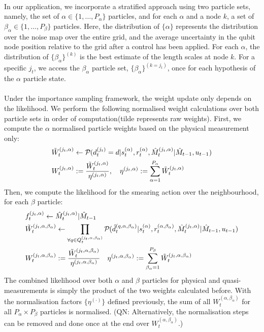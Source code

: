 \\
In our application, we incorporate a stratified approach using two particle sets, namely, the set of $\alpha \in \{1, \hdots ,P_\alpha\}$ particles, and for each $\alpha$ and a node $k$, a set of $\beta_\alpha \in \{1, \hdots ,P_\beta\}$ particles. Here, the distribution of $\{\alpha \}$  represents the distribution over the noise map over the entire grid, and the average uncertainty in the qubit node position relative to the grid after a control has been applied. For each $\alpha$, the distribution of $\{ \beta_\alpha \}^{(k)} $ is the best estimate of the length scales at node $k$. For a specific $j_t$, we access the $\beta_\alpha$ particle set, $\{ \beta_\alpha \}^{(k=j_t)} $, once for each hypothesis of the $\alpha$ particle state. \\
\\
Under the importance sampling framework, the weight update only depends on the likelihood. We perform the following normalised weight calculations over both particle sets in order of computation(tilde represents raw weights). First, we compute the $\alpha$ normalised particle weights based on the physical measurement only:
\begin{align}
\tilde{W}_t^{(j_t, \alpha)}& \leftarrow \mathcal{P}_{} ( d^{( j_t )}_{t}=d | s_{ t}^{(\alpha)}, r_{ t}^{(\alpha)}, \hat{M}_t^{(j_t, \alpha)}| \hat{M}_{t-1}, u_{t-1 } ) \\
W_t^{(j_t, \alpha)} &:= \frac{\tilde{W}_t^{(j_t, \alpha)}}{\eta^{(j_t, \alpha)}}, \quad \eta^{(j_t, \alpha)} := \sum_{\alpha = 1}^{P_{\alpha}} \tilde{W}_t^{(j_t, \alpha)}  
\end{align} 
Then, we compute the likelihood for the smearing action over the neighbourhood, for each $\beta$ particle:
\begin{align}
	&f^{( j_t, \alpha )}_{t}  \leftarrow \hat{M}_t^{(j_t, \alpha)}| \hat{M}_{t-1} \\ 
	&\tilde{W}_t^{(j_t, \alpha, \beta_\alpha)}  \leftarrow \prod_{\forall q \in Q^{( j_t, \alpha, \beta_\alpha )}_{t}} \mathcal{P}_{} (  \hat{d}^{( q, \alpha, \beta_\alpha )}_{t}|s_{ t}^{(\alpha)}, r_{ t}^{(\alpha, \beta_\alpha)}, \hat{M}_t^{(j_t, \alpha)}| \hat{M}_{t-1}, u_{t-1 } ) \\
	&W_t^{(j_t, \alpha, \beta_\alpha)}:= \frac{\tilde{W}_t^{(j_t, \alpha, \beta_\alpha)}}{\eta^{(j_t, \alpha, \beta_\alpha)}} \quad \eta^{(j_t, \alpha, \beta_\alpha)}:= \sum_{\beta_\alpha = 1}^{P_\beta}\tilde{W}_t^{(j_t, \alpha, \beta_\alpha)} 
\end{align}	The combined likelihood over both $\alpha$ and $\beta$ particles for physical and quasi-measurements is simply the product of the two weights calculated before.  With the normalisation factors $\{ \eta^{(\cdot)} \}$ defined previously, the sum of all $W_t^{(\alpha, \beta_\alpha)}$  for all $P_\alpha \times P_\beta$ particles is normalised. (QN: Alternatively, the normalisation steps can be removed and done once at the end over  $W_t^{(\alpha, \beta_\alpha)}.$)
